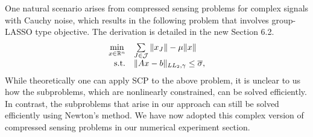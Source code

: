 \documentclass{article}
\def\R{\mathbb{R}}
\begin{document}
\begin{enumerate}
One natural scenario arises from compressed sensing problems for complex signals with Cauchy noise, which results in the following problem that involves group-LASSO type objective. The derivation is detailed in the new Section 6.2.
\begin{equation}\label{E2}
  \begin{array}{rl}
    \min\limits_{x\in\R^n} & \sum\limits_{J\in\mathcal{J}}\|x_J\| - \mu\|x\| \\
    {\rm s.t.} & \|Ax - b\|_{LL_2,\gamma}\leq \overline{\sigma},
  \end{array}
\end{equation}
While theoretically one can apply SCP to the above problem, it is unclear to us how the subproblems, which are nonlinearly constrained, can be solved efficiently. In contrast, the subproblems that arise in our approach can still be solved efficiently using Newton's method. We have now adopted this complex version of compressed sensing problems in our numerical experiment section.
%

\end{enumerate}
\end{document}

